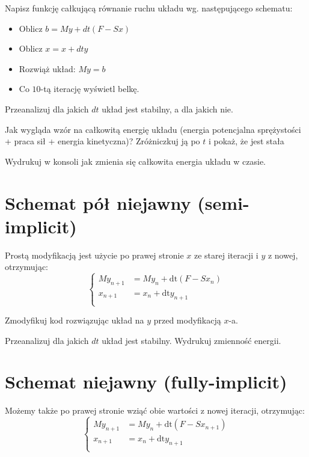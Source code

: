 \documentclass{instrukcja}
\begin{document}
\begin{zad}Napisz funkcję całkującą równanie ruchu układu wg. następującego schematu:
\begin{itemize}
\item Oblicz $b = My + dt(F - Sx)$
\item Oblicz $x = x + dt y$
\item Rozwiąż układ: $My=b$
\item Co $10$-tą iterację wyświetl belkę.
\end{itemize}\end{zad}

\begin{zad} Przeanalizuj dla jakich $dt$ układ jest stabilny, a dla jakich nie. \end{zad}
\begin{zad} Jak wygląda wzór na całkowitą energię układu (energia potencjalna sprężystości + praca sił + energia kinetyczna)? Zróżniczkuj ją po $t$ i pokaż, że jest stała\end{zad}
\begin{zad} Wydrukuj w konsoli jak zmienia się całkowita energia układu w czasie.\end{zad}

\section{Schemat pół niejawny (semi-implicit)}
Prostą modyfikacją jest użycie po prawej stronie $x$ ze starej iteracji i $y$ z nowej, otrzymując:
\[\begin{cases}
My_{n+1} &= My_n + \text{dt}( F - Sx_n)\\
x_{n+1} &= x_n + \text{dt} y_{n+1}\\
\end{cases}\]

\begin{zad} Zmodyfikuj kod rozwiązując układ na $y$ przed modyfikacją $x$-a. \end{zad}
\begin{zad} Przeanalizuj dla jakich $dt$ układ jest stabilny. Wydrukuj zmienność energii. \end{zad}

\section{Schemat niejawny (fully-implicit)}

Możemy także po prawej stronie wziąć obie wartości z nowej iteracji, otrzymując:
\[\begin{cases}
My_{n+1} &= My_n + \text{dt}( F - Sx_{n+1})\\
x_{n+1} &= x_n + \text{dt} y_{n+1}\\
\end{cases}\]
\end{document}
